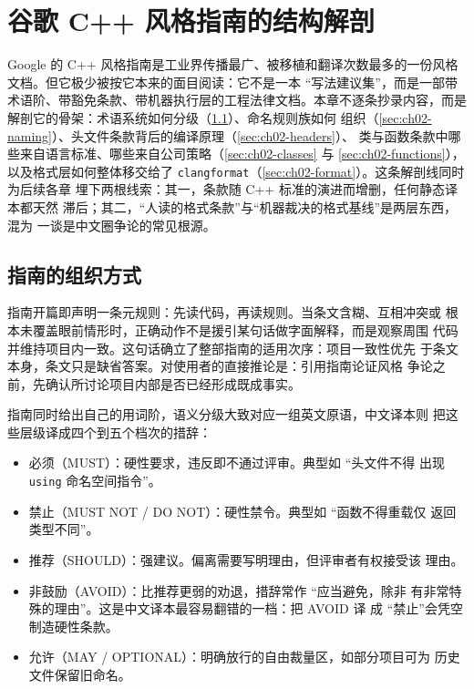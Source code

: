 \documentclass[12pt,a4paper,fontset=fandol]{ctexbook}
\newcommand{\Tp}[1]{\texttt{#1}}
\newcommand{\Bk}{\discretionary{}{}{}}
\newcommand{\Lang}[1]{\textsf{#1}}
\newcommand{\CPP}{\Lang{C++}}
\newcommand{\DomGo}{\Lang{Google}}
\begin{document}
\chapter{谷歌 C++ 风格指南的结构解剖}
\label{ch:ch02-google}

\DomGo{} 的 C++ 风格指南是工业界传播最广、被移植和翻译次数最多的一份风格
文档。但它极少被按它本来的面目阅读：它不是一本 ``写法建议集''，而是一部带
术语阶、带豁免条款、带机器执行层的工程法律文档。本章不逐条抄录内容，而是
解剖它的骨架：术语系统如何分级（\ref{sec:ch02-structure}）、命名规则族如何
组织（\ref{sec:ch02-naming}）、头文件条款背后的编译原理（\ref{sec:ch02-headers}）、
类与函数条款中哪些来自语言标准、哪些来自公司策略（\ref{sec:ch02-classes}
与 \ref{sec:ch02-functions}），以及格式层如何整体移交给了
\Tp{clang{\Bk}format}（\ref{sec:ch02-format}）。这条解剖线同时为后续各章
埋下两根线索：其一，条款随 \CPP{} 标准的演进而增删，任何静态译本都天然
滞后；其二，``人读的格式条款''与``机器裁决的格式基线''是两层东西，混为
一谈是中文圈争论的常见根源。

\section{指南的组织方式}
\label{sec:ch02-structure}

指南开篇即声明一条元规则：先读代码，再读规则。当条文含糊、互相冲突或
根本未覆盖眼前情形时，正确动作不是援引某句话做字面解释，而是观察周围
代码并维持项目内一致。这句话确立了整部指南的适用次序：项目一致性优先
于条文本身，条文只是缺省答案。对使用者的直接推论是：引用指南论证风格
争论之前，先确认所讨论项目内部是否已经形成既成事实。

指南同时给出自己的用词阶，语义分级大致对应一组英文原语，中文译本则
把这些层级译成四个到五个档次的措辞：

\begin{itemize}
  \item 必须（MUST）：硬性要求，违反即不通过评审。典型如 ``头文件不得
        出现 \Tp{using} 命名空间指令''。
  \item 禁止（MUST NOT / DO NOT）：硬性禁令。典型如 ``函数不得重载仅
        返回类型不同''。
  \item 推荐（SHOULD）：强建议。偏离需要写明理由，但评审者有权接受该
        理由。
  \item 非鼓励（AVOID）：比推荐更弱的劝退，措辞常作 ``应当避免，除非
        有非常特殊的理由''。这是中文译本最容易翻错的一档：把 AVOID 译
        成 ``禁止''会凭空制造硬性条款。
  \item 允许（MAY / OPTIONAL）：明确放行的自由裁量区，如部分项目可为
        历史文件保留旧命名。
\end{itemize}
\end{document}
